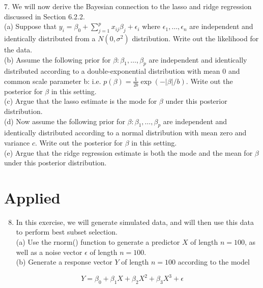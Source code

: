 \documentclass[10pt]{article}
\begin{document}
7. We will now derive the Bayesian connection to the lasso and ridge regression discussed in Section 6.2.2.\\
(a) Suppose that $y_{i}=\beta_{0}+\sum_{j=1}^{p} x_{i j} \beta_{j}+\epsilon_{i}$ where $\epsilon_{1}, \ldots, \epsilon_{n}$ are independent and identically distributed from a $N\left(0, \sigma^{2}\right)$ distribution. Write out the likelihood for the data.\\
(b) Assume the following prior for $\beta: \beta_{1}, \ldots, \beta_{p}$ are independent and identically distributed according to a double-exponential distribution with mean 0 and common scale parameter b: i.e. $p(\beta)=\frac{1}{2 b} \exp (-|\beta| / b)$. Write out the posterior for $\beta$ in this setting.\\
(c) Argue that the lasso estimate is the mode for $\beta$ under this posterior distribution.\\
(d) Now assume the following prior for $\beta: \beta_{1}, \ldots, \beta_{p}$ are independent and identically distributed according to a normal distribution with mean zero and variance $c$. Write out the posterior for $\beta$ in this setting.\\
(e) Argue that the ridge regression estimate is both the mode and the mean for $\beta$ under this posterior distribution.

\section*{Applied}
\begin{enumerate}
  \setcounter{enumi}{7}
  \item In this exercise, we will generate simulated data, and will then use this data to perform best subset selection.\\
(a) Use the rnorm() function to generate a predictor $X$ of length $n=100$, as well as a noise vector $\epsilon$ of length $n=100$.\\
(b) Generate a response vector $Y$ of length $n=100$ according to the model
\end{enumerate}

$$
Y=\beta_{0}+\beta_{1} X+\beta_{2} X^{2}+\beta_{3} X^{3}+\epsilon
$$
\end{document}
